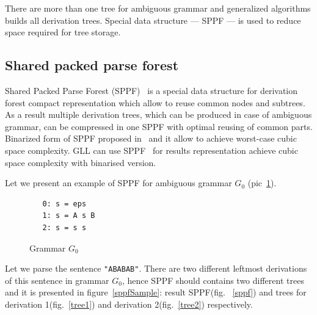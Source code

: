 There are more than one tree for ambiguous grammar and generalized algorithms builds all derivation trees. Special data structure --- SPPF --- is used to reduce space required for tree storage.


\subsection{Shared packed parse forest}

Shared Packed Parse Forest (SPPF)~\cite{SPPF} is a special data structure for derivation forest compact representation which allow to reuse common nodes and subtrees.
As a result multiple derivation trees, which can be produced in case of ambiguous grammar, can be compressed in one SPPF with optimal reusing of common parts.  
Binarized form of SPPF proposed in~\cite{brnglr} and it allow to achieve worst-case cubic space complexity.
GLL can use SPPF~\cite{gllParsingTree} for results representation achieve cubic space complexity with binarised version.

Let we present an example of SPPF for ambiguous grammar $G_0$ (pic~\ref{grammarG0}).

\begin{figure}[h]
   \begin{center}
\begin{verbatim}
   0: s = eps
   1: s = A s B
   2: s = s s
\end{verbatim}
   \caption{Grammar $G_0$}
   \label{grammarG0}        
   \end{center}
\end{figure}


Let we parse the sentence \verb|"ABABAB"|. 
There are two different leftmost derivations of this sentence in grammar $G_0$, hence SPPF should contains two different trees and it is presented in figure~\ref{sppfSample}: result SPPF(fig. ~\ref{sppf}) and trees for derivation 1(fig.~\ref{tree1}) and derivation 2(fig.~\ref{tree2}) respectively. 
 
